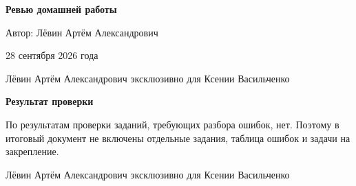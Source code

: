 \documentclass[12pt,a4paper]{article}
\begin{document}
\begin{titlepage}
\thispagestyle{empty}
\begin{center}
\vspace*{0.23\textheight}

{\LARGE\bfseries Ревью домашней работы\par}

\vspace{1.8cm}
{\large Автор: Лёвин Артём Александрович\par}
\vspace{0.6cm}
{\large 28 сентября 2026 года\par}

\vfill
{\small Лёвин Артём Александрович эксклюзивно для Ксении Васильченко\par}
\vspace{0.5cm}
\end{center}
\end{titlepage}

\thispagestyle{empty}
\begin{center}
{\Large\bfseries Результат проверки}
\end{center}

\vspace{1.2cm}

По результатам проверки заданий, требующих разбора ошибок, нет. Поэтому в итоговый документ не включены отдельные задания, таблица ошибок и задачи на закрепление.

\vfill
\begin{center}
{\small Лёвин Артём Александрович эксклюзивно для Ксении Васильченко}
\end{center}
\end{document}
